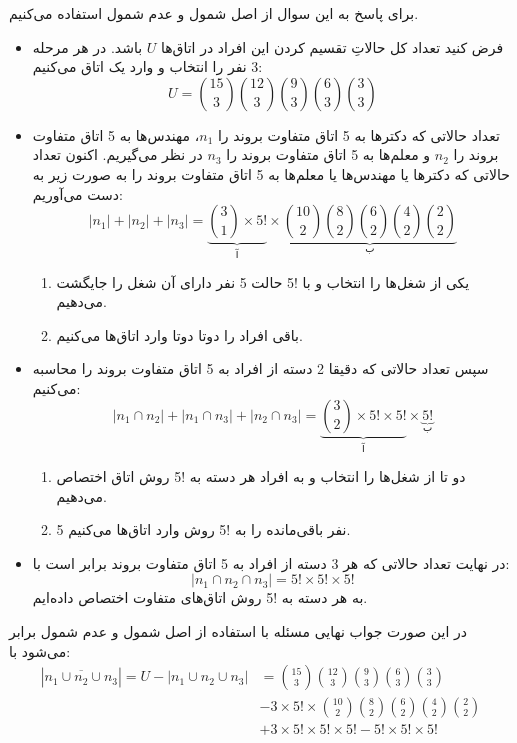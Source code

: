 \p
برای پاسخ به این سوال از اصل شمول و عدم شمول استفاده می‌کنیم.
\begin{itemize}
    \item 
    فرض کنید تعداد کل حالاتِ تقسیم کردن این افراد در اتاق‌ها
   $U$
   باشد.
   در هر مرحله 3 نفر را انتخاب و وارد یک اتاق می‌کنیم:
    $$U = \binom{15}{3}\binom{12}{3}\binom{9}{3}\binom{6}{3}\binom{3}{3}$$

    \item 
    تعداد حالاتی که دکترها به 5 اتاق متفاوت بروند را 
    $n_1$،
    مهندس‌ها به 5 اتاق متفاوت بروند را
    $n_2$
    و معلم‌ها به 5 اتاق متفاوت بروند را 
    $n_3$
    در نظر می‌گیریم. 
    اکنون تعداد حالاتی که دکترها یا مهندس‌ها یا معلم‌ها به 5 اتاق متفاوت بروند را به صورت زیر به دست می‌آوریم:
    $$|n_1| + |n_2| + |n_3| = \underbrace{\binom{3}{1}\times5!}_{\text{آ}}\times\underbrace{\binom{10}{2}\binom{8}{2}\binom{6}{2}\binom{4}{2}\binom{2}{2}}_{\text{ب}}$$
    \begin{enumerate}
     \item 
    یکی از شغل‌ها را انتخاب و با !5 حالت 5 نفر دارای آن شغل را جایگشت می‌دهیم.
    \item  
    باقی افراد را دو‌تا دو‌تا وارد اتاق‌ها می‌کنیم.
    \end{enumerate}
    \item 
    سپس تعداد حالاتی که دقیقا 2 دسته از افراد به 5 اتاق متفاوت بروند را محاسبه می‌کنیم:
    $$|n_1 \cap n_2| + |n_1 \cap n_3| + |n_2 \cap n_3| = \underbrace{\binom{3}{2}\times5!\times5!}_{\text{آ}}\times \underbrace{5!}_{\text{ب}}$$
    \begin{enumerate}
     \item
    دو تا از شغل‌ها را انتخاب و به افراد هر دسته به !5 روش اتاق اختصاص می‌دهیم.
    \item
      5 نفر باقی‌مانده را به !5 روش وارد اتاق‌ها می‌کنیم.
    \end{enumerate}
    \item 
     در نهایت تعداد حالاتی که هر 3 دسته از افراد به 5 اتاق متفاوت بروند برابر
    است با:
    $$|n_1 \cap n_2 \cap n_3| = 5!\times5!\times5!$$
    به هر دسته به !5 روش اتاق‌های متفاوت اختصاص داده‌ایم.
\end{itemize}
در این صورت جواب نهایی مسئله با استفاده از اصل شمول و عدم شمول برابر می‌شود با:
  \begin{align*}
    |\overline{n_1 \cup n_2 \cup n_3}| = U - |n_1 \cup n_2 \cup n_3|
    &= \binom{15}{3}\binom{12}{3}\binom{9}{3}\binom{6}{3}\binom{3}{3}\\ 
     &- 3\times5!\times\binom{10}{2}\binom{8}{2}\binom{6}{2}\binom{4}{2}\binom{2}{2}\\
     &+ 3\times5!\times5!\times5!-5!\times5!\times5! 
  \end{align*}
